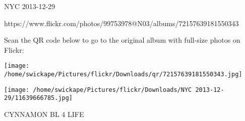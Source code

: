 \documentclass[10pt,letterpaper]{article}
\begin{document}
NYC 2013-12-29

https://www.flickr.com/photos/99753978@N03/albums/72157639181550343

Scan the QR code below to go to the original album with full-size photos on Flickr:

\texttt{[image: /home/swickape/Pictures/flickr/Downloads/qr/72157639181550343.jpg]}
\pagebreak

\texttt{[image: /home/swickape/Pictures/flickr/Downloads/NYC 2013-12-29/11639666785.jpg]}

CYNNAMON BL 4 LIFE\\
\pagebreak
\end{document}
